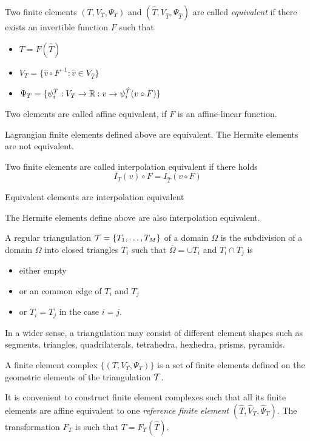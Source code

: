 Two finite elements $(T,V_T, \Psi_T)$ and 
$(\widehat T, V_{\widehat T}, \Psi_{\widehat T})$ are called 
{\em equivalent} if there exists an invertible function $F$ such that
\begin{itemize}
\item $T = F (\widehat T)$
\item $V_T = \{ \hat v \circ F^{-1} : \hat v \in V_{\widehat T} \}$
\item $\Psi_T = \{ \psi^T_i : V_T \rightarrow {\mathbb R} : v \rightarrow \psi^{\hat T}_i (v \circ F) \}$
\end{itemize}
Two elements are called affine equivalent, if $F$ is an affine-linear function.

Lagrangian finite elements defined above are equivalent. The Hermite elements are not equivalent.

Two finite elements are called interpolation equivalent if there holds
$$
I_T (v) \circ F = I_{\widehat T} (v \circ F)
$$

\begin{lemma} Equivalent elements are interpolation equivalent
\end{lemma}

The Hermite elements define above are also interpolation equivalent.

A regular triangulation ${\cal T} = \{ T_1, \ldots, T_M \}$ of a domain 
$\Omega$ is the subdivision of a domain $\Omega$ into closed triangles $T_i$
such that $\overline \Omega = \cup T_i$ and $T_i \cap T_j$ is 
\begin{itemize}
\item either empty
\item or an common edge of $T_i$ and $T_j$
\item or $T_i = T_j$ in the case $i = j$.
\end{itemize}
%
In a wider sense, a triangulation may consist of different element shapes such
as segments, triangles,  quadrilaterals, tetrahedra, hexhedra, prisms, pyramids.


A finite element complex $\{ (T, V_T, \Psi_T) \}$ is a set of finite elements
defined on the geometric elements of the triangulation ${\cal T}$.

It is convenient to construct finite element complexes such that all
its finite elements are affine equivalent to one {\em reference finite element} $(\widehat T, \hat V_T, \hat \Psi_T)$. The transformation $F_T$ is such that
$T = F_T (\widehat T)$.


